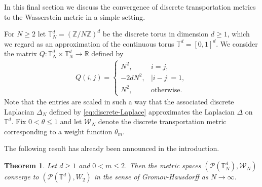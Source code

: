 \documentclass[a4paper,11pt,reqno]{amsart}
\theoremstyle{plain}
\newtheorem{theorem}{Theorem}[section]
\theoremstyle{remark}
\numberwithin{equation}{section}
\begin{document}
In this final section we discuss the convergence of discrete
transportation metrics to the Wasserstein metric in a simple setting.

For $N \geq 2$ let ${{{\mathbb{T}_N^d}}} = ({{\mathbb Z}} / N {{\mathbb Z}})^d$ be the discrete torus in
dimension $d \geq 1$, which we regard as an approximation of the
continuous torus $\mathbb{T}^d = [0,1]^d$. We consider the matrix $Q :
{{{\mathbb{T}_N^d}}} \times {{{\mathbb{T}_N^d}}} \to {{\mathbb R}}$ defined by
\begin{align*}
Q(i,j) =  \left\{ \begin{array}{ll}
N^2,
 & \text{$i = j$},\\
-2 d N^2,
 & \text{$|i - j| =1$},\\
N^2,
 & \text{otherwise}.\end{array} \right.
\end{align*}
Note that the entries are scaled in such a way that the associated
discrete Laplacian $\Delta_N$ defined by \eqref{eq:discrete-Laplace}
approximates the Laplacian $\Delta$ on ${{\mathbb T}}^d$. Fix $0 < \theta \leq 1$
and let ${\mathcal{W}_N}$ denote the discrete transportation metric corresponding
to a weight function $\theta_m$.

The following result has already been announced in the introduction.

\begin{theorem}\label{thm:GH}
  Let $d \geq 1$ and $0 < m \leq 2$.
  Then the metric spaces $({\mathcal{P}({{{\mathbb{T}_N^d}}})},{\mathcal{W}}_N)$ converge to
  $({\mathscr{P}}(\mathbb{T}^d),W_2)$ in the sense of Gromov-Hausdorff as $N 
  \to \infty$.
\end{theorem}
\end{document}
